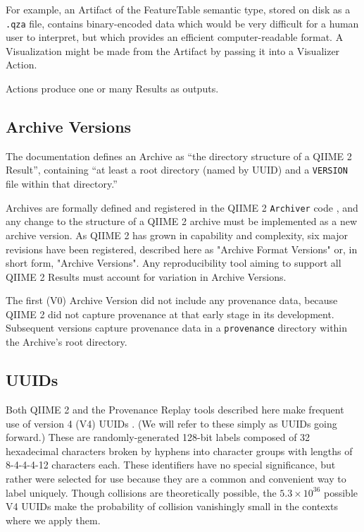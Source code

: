 For example, an Artifact of the FeatureTable semantic type, stored on disk as a
\texttt{.qza} file, contains binary-encoded data which would be very difficult for a
human user to interpret, but which provides an efficient computer-readable
format. A Visualization might be made from the Artifact by passing it into a
Visualizer Action.

Actions produce one or many Results as outputs.

\subsection{Archive Versions}

The documentation defines an Archive as “the directory structure of a QIIME 2
Result”, containing “at least a root directory (named by UUID) and a \texttt{VERSION}
file within that directory.” 

Archives are formally defined and registered in the QIIME 2 \texttt{Archiver} code \parencite{qiime_2_development_team_qiime2_2016},
and any change to the structure of a QIIME 2 archive must be implemented as a new
archive version. As QIIME 2 has grown in capability and complexity, six
major revisions have been registered, described here as "Archive Format Versions"
or, in short form, "Archive Versions". Any reproducibility tool aiming to support all
QIIME 2 Results must account for variation in Archive Versions.

The first (V0) Archive Version did not include any provenance data, because
QIIME 2 did not capture provenance at that early stage in its development.
Subsequent versions capture provenance data in a \texttt{provenance} directory
within the Archive’s root directory.

\subsection{UUIDs}

Both QIIME 2 and the Provenance Replay tools described here make frequent use of
version 4 (V4) UUIDs \parencite{leach_universally_2005}.
(We will refer to these simply as UUIDs going forward.)
These are randomly-generated 128-bit labels composed of 32 hexadecimal
characters broken by hyphens into character groups with lengths of 8-4-4-4-12
characters each. These identifiers have no special significance, but rather were
selected for use because they are a common and convenient way to label uniquely.
Though collisions are theoretically possible, the $5.3\times10^{36}$ possible V4 UUIDs
make the probability of collision vanishingly small in the contexts where we
apply them.

